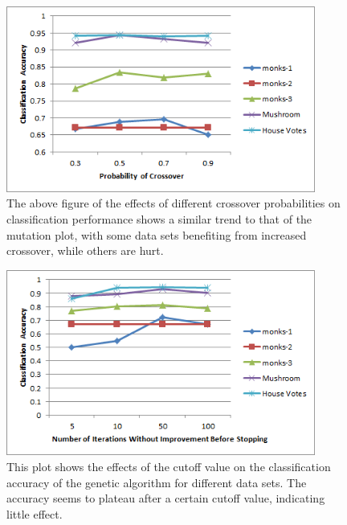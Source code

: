 \documentclass[12pt, letterpaper]{article}
\begin{document}
\begin{figure}[!htb]
\begin{center}
\includegraphics[width=4in]{images/crossover.png}
\end{center}
\caption{The above figure of the effects of different crossover probabilities on
classification performance shows a similar trend to that of the mutation plot,
with some data sets benefiting from increased crossover, while others are hurt.
}
\label{Testing Times of Multiple Decision Trees}
\end{figure}


\begin{figure}[!htb]
\begin{center}
\includegraphics[width=4in]{images/cutoff_accuracy.png}
\end{center}
\caption{This plot shows the effects of the cutoff value on the classification
accuracy of the genetic algorithm for different data sets.  The accuracy seems
to plateau after a certain cutoff value, indicating little effect.
}
\label{Testing Times of Multiple Decision Trees}
\end{figure}
\end{document}
